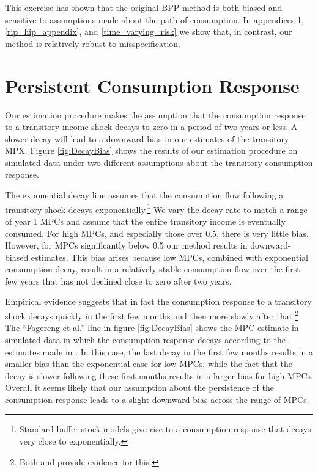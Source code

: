 \documentclass[titlepage]{\econtex}\newcommand{\texname}{ConsumptionHeterogeneity}
\begin{document}
	This exercise has shown that the original BPP method is both biased and sensitive to assumptions made about the path of consumption. In appendices \ref{Consumption_persistence}, \ref{rip_hip_appendix}, and \ref{time_varying_risk} we show that, in contrast, our method is relatively robust to misspecification.
	
	\section{Persistent Consumption Response} \label{Consumption_persistence}
	\setcounter{figure}{0}   
	\setcounter{table}{0} 
	
	Our estimation procedure makes the assumption that the consumption response to a transitory income shock decays to zero in a period of two years or less. A slower decay will lead to a downward bias in our estimates of the transitory MPX. Figure \ref{fig:DecayBias} shows the results of our estimation procedure on simulated data under two different assumptions about the transitory consumption response.
	
	The exponential decay line assumes that the consumption flow following a transitory shock decays exponentially.\footnote{Standard buffer-stock models give rise to a consumption response that decays very close to exponentially.} We vary the decay rate to match a range of year 1 MPCs and assume that the entire transitory income is eventually consumed. For high MPCs, and especially those over 0.5, there is very little bias. However, for MPCs significantly below 0.5 our method results in downward-biased estimates. This bias arises because low MPCs, combined with exponential consumption decay, result in a relatively stable consumption flow over the first few years that has not declined close to zero after two years.
	
	Empirical evidence suggests that in fact the consumption response to a transitory shock decays quickly in the first few months and then more slowly after that.\footnote{Both \cite{fagereng_mpc_2016} and \cite{gelman_what_2016} provide evidence for this.} The ``Fagereng et al.'' line in figure \ref{fig:DecayBias} shows the MPC estimate in simulated data in which the consumption response decays according to the estimates made in \cite{fagereng_mpc_2016}. In this case, the fast decay in the first few months results in a smaller bias than the exponential case for low MPCs, while the fact that the decay is slower following these first months results in a larger bias for high MPCs. Overall it seems likely that our assumption about the persistence of the consumption response leads to a slight downward bias across the range of MPCs.
	
\end{document}
